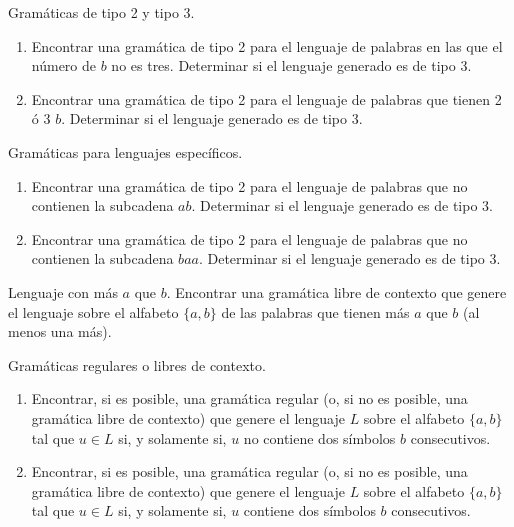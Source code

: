 \documentclass[12pt]{report} %
\begin{document}
\begin{ejercicio}
Gramáticas de tipo 2 y tipo 3. 

\begin{enumerate}[label=\alph*)]
    \item Encontrar una gramática de tipo 2 para el lenguaje de palabras en las que el número de $b$ no es tres.  
    Determinar si el lenguaje generado es de tipo 3.

    \item Encontrar una gramática de tipo 2 para el lenguaje de palabras que tienen 2 ó 3 $b$.  
    Determinar si el lenguaje generado es de tipo 3.
\end{enumerate}

\end{ejercicio}

\begin{ejercicio}
Gramáticas para lenguajes específicos.

\begin{enumerate}[label=\alph*)]
    \item Encontrar una gramática de tipo 2 para el lenguaje de palabras que no contienen la subcadena $ab$.  
    Determinar si el lenguaje generado es de tipo 3.

    \item Encontrar una gramática de tipo 2 para el lenguaje de palabras que no contienen la subcadena $baa$.  
    Determinar si el lenguaje generado es de tipo 3.
\end{enumerate}

\end{ejercicio}

\begin{ejercicio}
Lenguaje con más $a$ que $b$. Encontrar una gramática libre de contexto que genere el lenguaje sobre el alfabeto $\{a, b\}$ de las palabras que tienen más $a$ que $b$ (al menos una más).
\end{ejercicio}

\begin{ejercicio}
Gramáticas regulares o libres de contexto.

\begin{enumerate}[label=\alph*)]
    \item Encontrar, si es posible, una gramática regular (o, si no es posible, una gramática libre de contexto) que genere el lenguaje $L$ sobre el alfabeto $\{a, b\}$ tal que $u \in L$ si, y solamente si, $u$ no contiene dos símbolos $b$ consecutivos.

    \item Encontrar, si es posible, una gramática regular (o, si no es posible, una gramática libre de contexto) que genere el lenguaje $L$ sobre el alfabeto $\{a, b\}$ tal que $u \in L$ si, y solamente si, $u$ contiene dos símbolos $b$ consecutivos.
\end{enumerate}
\end{ejercicio}
\end{document}
